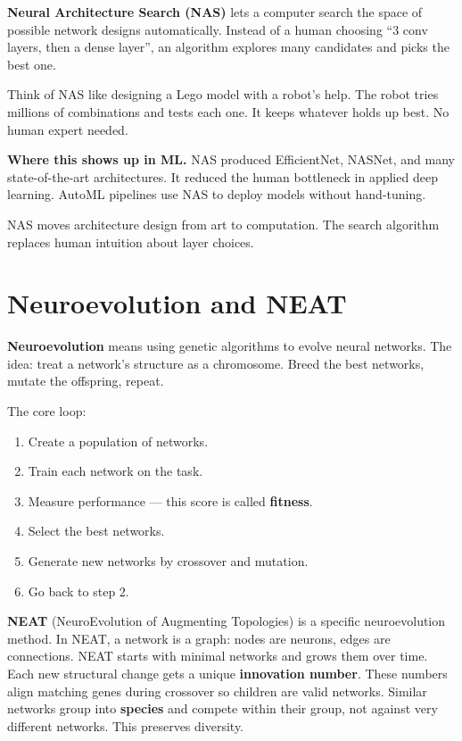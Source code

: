 \documentclass[a4paper,11pt]{article}
\newcommand{\vocab}[1]{\textbf{\color{navy}#1}}
\begin{document}
\begin{intuition}
\vocab{Neural Architecture Search (NAS)} lets a computer search the
space of possible network designs automatically.
Instead of a human choosing ``3 conv layers, then a dense layer'',
an algorithm explores many candidates and picks the best one.
\end{intuition}

\begin{everyday}
Think of NAS like designing a Lego model with a robot's help.
The robot tries millions of combinations and tests each one.
It keeps whatever holds up best.
No human expert needed.
\end{everyday}

\textbf{Where this shows up in ML.}
NAS produced EfficientNet, NASNet, and many state-of-the-art
architectures.
It reduced the human bottleneck in applied deep learning.
AutoML pipelines use NAS to deploy models without hand-tuning.

\begin{keytake}
NAS moves architecture design from art to computation.
The search algorithm replaces human intuition about layer choices.
\end{keytake}

\section{Neuroevolution and NEAT}

\vocab{Neuroevolution} means using genetic algorithms to evolve neural
networks.
The idea: treat a network's structure as a chromosome.
Breed the best networks, mutate the offspring, repeat.

The core loop:
\begin{enumerate}
  \item Create a population of networks.
  \item Train each network on the task.
  \item Measure performance --- this score is called \vocab{fitness}.
  \item Select the best networks.
  \item Generate new networks by crossover and mutation.
  \item Go back to step 2.
\end{enumerate}

\vocab{NEAT} (NeuroEvolution of Augmenting Topologies) is a specific
neuroevolution method.
In NEAT, a network is a graph: nodes are neurons, edges are connections.
NEAT starts with minimal networks and grows them over time.
Each new structural change gets a unique \vocab{innovation number}.
These numbers align matching genes during crossover so children are
valid networks.
Similar networks group into \vocab{species} and compete within their
group, not against very different networks.
This preserves diversity.
\end{document}
